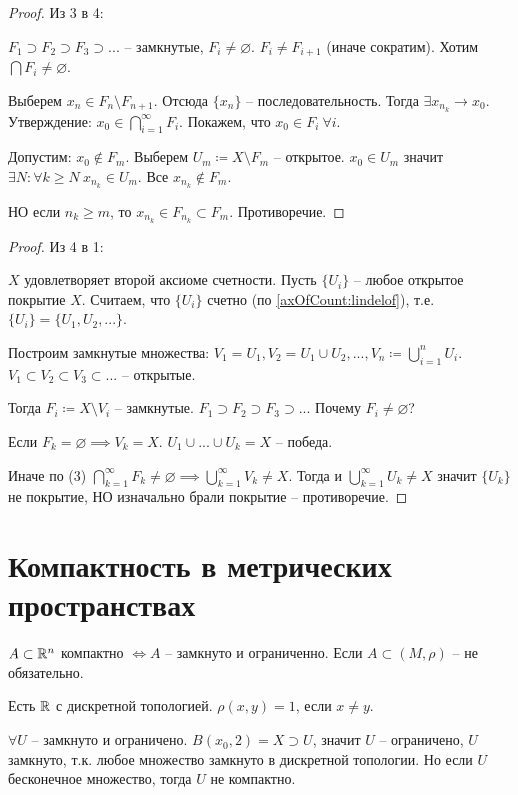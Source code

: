 \documentclass[main]{subfiles}
\begin{document}
\begin{proof}
    Из 3 в 4:

    $F_1 \supset F_2 \supset F_3 \supset ...$ -- замкнутые, $F_i \neq \varnothing$.
    $F_i \neq F_{i+1}$ (иначе сократим).
    Хотим $\bigcap F_i \neq \varnothing$.

    Выберем $x_n \in F_n \setminus F_{n+1}$.
    Отсюда $\{x_n\}$ -- последовательность.
    Тогда $\exists x_{n_k} \to x_0$.
    Утверждение: $x_0 \in \bigcap_{i=1}^\infty F_i$. Покажем, что $x_0 \in F_i\ \forall i$.

    Допустим: $x_0 \not\in F_m$.
    Выберем $U_m \coloneqq X \setminus F_m$ -- открытое.
    $x_0 \in U_m$ значит $\exists N: \forall k \ge N\ x_{n_k} \in U_m$.
    Все $x_{n_k} \not\in F_m$.

    НО если $n_k \ge m$, то $x_{n_k} \in F_{n_k} \subset F_m$. Противоречие.
\end{proof}
\begin{proof}
    Из 4 в 1:

    $X$ удовлетворяет второй аксиоме счетности.
    Пусть $\{U_i\}$  -- любое открытое покрытие $X$.
    Считаем, что $\{U_i\}$ счетно (по \ref{axOfCount:lindelof}), т.е. $\{U_i\} = \{U_1, U_2, ...\}$.

    Построим замкнутые множества:
    $V_1 = U_1, V_2 = U_1 \cup U_2, ..., V_n \coloneqq \bigcup_{i=1}^n U_i$.
    $V_1 \subset V_2 \subset V_3 \subset ...$ -- открытые.

    Тогда $F_i \coloneqq X \setminus V_i$ -- замкнутые.
    $F_1 \supset F_2 \supset F_3 \supset ...$
    Почему $F_i \neq \varnothing$?

    Если $F_k = \varnothing \implies V_k = X$.
    $U_1 \cup ... \cup U_k = X$ -- победа.

    Иначе по (3) $\bigcap_{k=1}^\infty F_k \neq \varnothing \implies \bigcup_{k=1}^\infty V_k \neq X$.
    Тогда и $\bigcup_{k=1}^\infty U_k \neq X$ значит $\{U_k\}$ не покрытие,
    НО изначально брали покрытие -- противоречие.
\end{proof}

\section{Компактность в метрических пространствах}
\begin{remark}
    $A \subset \mathbb{R}^n$ компактно $\Leftrightarrow A$ -- замкнуто и ограниченно.
    Если $A \subset (M, \rho)$ -- не обязательно.
\end{remark}
\begin{example}
    Есть $\mathbb{R}$ с дискретной топологией. $\rho(x,y) = 1$, если $x \neq y$.

    $\forall U$ -- замкнуто и ограничено. $B(x_0, 2) = X \supset U$, значит $U$ -- ограничено,
    $U$ замкнуто, т.к. любое множество замкнуто в дискретной топологии.
    Но если $U$ бесконечное множество, тогда $U$ не компактно.
\end{example}
\end{document}
